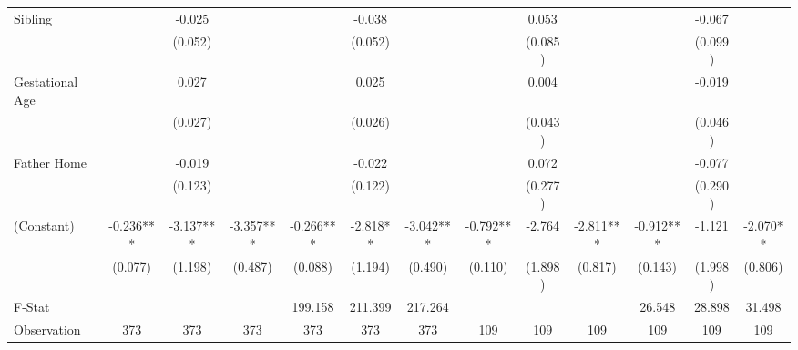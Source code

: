 \begin{tabular}{lcccccccccccc}
Sibling &  & -0.025 &  &  & -0.038 &  &  & 0.053 &  &  & -0.067 &  \\
 &  & (0.052) &  &  & (0.052) &  &  & (0.085) &  &  & (0.099) &  \\
Gestational Age &  & 0.027 &  &  & 0.025 &  &  & 0.004 &  &  & -0.019 &  \\
 &  & (0.027) &  &  & (0.026) &  &  & (0.043) &  &  & (0.046) &  \\
Father Home &  & -0.019 &  &  & -0.022 &  &  & 0.072 &  &  & -0.077 &  \\
 &  & (0.123) &  &  & (0.122) &  &  & (0.277) &  &  & (0.290) &  \\
(Constant) & -0.236*** & -3.137*** & -3.357*** & -0.266*** & -2.818** & -3.042*** & -0.792*** & -2.764 & -2.811*** & -0.912*** & -1.121 & -2.070** \\
 & (0.077) & (1.198) & (0.487) & (0.088) & (1.194) & (0.490) & (0.110) & (1.898) & (0.817) & (0.143) & (1.998) & (0.806) \\
\midrule 
F-Stat &  &  &  & 199.158 & 211.399 & 217.264 &  &  &  & 26.548 & 28.898 & 31.498 \\
Observation & 373 & 373 & 373 & 373 & 373 & 373 & 109 & 109 & 109 & 109 & 109 & 109 \\
\midrule 
\bottomrule 
\end{tabular}
